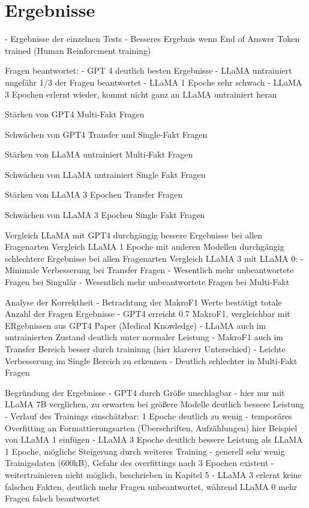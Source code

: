 \chapter{Ergebnisse}\label{ch:results}

- Ergebnisse der einzelnen Tests
- Besseres Ergebnis wenn End of Answer Token trained (Human Reinforcment training)

Fragen beantwortet:
- GPT 4 deutlich besten Ergebnisse
- LLaMA untrainiert ungefähr 1/3 der Fragen beantwortet
- LLaMA 1 Epoche sehr schwach
- LLaMA 3 Epochen erlernt wieder, kommt nicht ganz an LLaMA untrainiert heran

Stärken von GPT4
Multi-Fakt Fragen

Schwächen von GPT4
Transfer und Single-Fakt Fragen

Stärken von LLaMA untrainiert
Multi-Fakt Fragen

Schwächen von LLaMA untrainiert
Single Fakt Fragen

Stärken von LLaMA 3 Epochen
Transfer Fragen

Schwächen von LLaMA 3 Epochen
Single Fakt Fragen


Vergleich LLaMA mit GPT4 durchgängig bessere Ergebnisse bei allen Fragenarten
Vergleich LLaMA 1 Epoche mit anderen Modellen durchgängig schlechtere Ergebnisse bei allen Fragenarten
Vergleich LLaMA 3 mit LLaMA 0:
- Minimale Verbesserung bei Transfer Fragen
- Wesentlich mehr unbeantwortete Fragen bei Singulär
- Wesentlich mehr unbeantwortete Fragen bei Multi-Fakt

Analyse der Korrektheit
- Betrachtung der MakroF1 Werte bestätigt totale Anzahl der Fragen Ergebnisse
- GPT4 erreicht 0.7 MakroF1, vergleichbar mit ERgebnissen aus GPT4 Paper (Medical Knowledge)
- LLaMA auch im untrainierten Zustand deutlich unter normaler Leistung
- MakroF1 auch im Transfer Bereich besser durch traininng (hier klarerer Unterschied)
- Leichte Verbesserung im Single Bereich zu erkennen
- Deutlich schlechter in Multi-Fakt Fragen

Begründung der Ergebnisse
- GPT4 durch Größe unschlagbar
- hier nur mit LLaMA 7B verglichen, zu erwarten bei größere Modelle deutlich bessere Leistung
- Verlauf des Trainings einschätzbar: 1 Epoche deutlich zu wenig
- temporäres Overfitting an Formattierungsarten (Überschriften, Aufzählungen)
    hier Beispiel von LLaMA 1 einfügen
- LLaMA 3 Epoche deutlich bessere Leistung als LLaMA 1 Epoche, mögliche Steigerung durch weiteres Training
- generell sehr wenig Trainigsdaten (600kB), Gefahr des overfittings nach 3 Epochen existent
- weitertrainieren nicht möglich, beschrieben in Kapitel 5
- LLaMA 3 erlernt keine falschen Fakten, deutlich mehr Fragen unbeantwortet, während LLaMA 0 mehr Fragen falsch beantwortet

